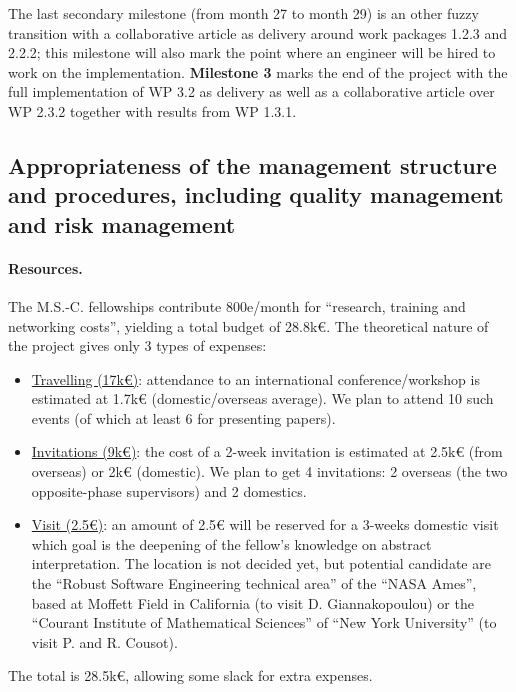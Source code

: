 \documentclass{article}[11pt]
\begin{document}
The last secondary milestone (from month 27 to month 29) is an other fuzzy transition with a collaborative article as delivery around work packages 1.2.3 and 2.2.2; this milestone will also mark the point where an engineer will be hired to work on the implementation.   {\bf Milestone 3} marks the end of the project with the full implementation of WP 3.2 as delivery as well as a collaborative article over WP 2.3.2 together with results from WP 1.3.1.


\subsection{Appropriateness of the management structure and procedures, including quality management and risk management}

\paragraph{Resources.} The M.S.-C. fellowships contribute 800e/month for “research, training and networking costs”, yielding a total budget of 28.8k€. The theoretical nature of the project gives only 3 types of expenses:
\begin{itemize}[itemindent=-2em,leftmargin=2em, labelsep=0.5em, itemsep=0em]
\item[]\underline{Travelling (17k€)}: attendance to an international conference/workshop is estimated at 1.7k€ (domestic/overseas average). We plan to attend 10 such events (of which at least 6 for presenting papers).
\item[]\underline{Invitations (9k€)}: the cost of a 2-week invitation is estimated at 2.5k€ (from overseas) or 2k€ (domestic). We plan to get 4 invitations: 2 overseas (the two opposite-phase supervisors) and 2 domestics.
\item[]\underline{Visit (2.5€)}: an amount of 2.5€ will be reserved for a 3-weeks domestic visit which goal is the deepening of the fellow's knowledge on abstract interpretation. The location is not decided yet, but potential candidate are the ``Robust Software Engineering technical area'' of the ``NASA Ames'', based at Moffett Field in California (to visit D. Giannakopoulou) or the ``Courant Institute of Mathematical Sciences'' of ``New York University'' (to visit P. and R. Cousot).
\end{itemize}
The total is 28.5k€, allowing some slack for extra expenses.
\end{document}
